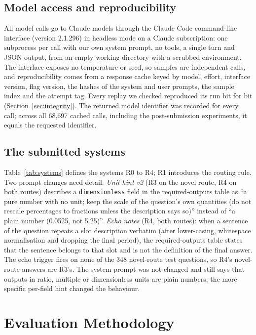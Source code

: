 \documentclass[conference]{IEEEtran}
\newcommand{\id}[1]{\texttt{#1}}
\begin{document}
\subsection{Model access and reproducibility}\label{sec:model}
All model calls go to Claude models through the Claude Code command-line interface (version 2.1.296) in headless mode on a Claude subscription: one subprocess per call with our own system prompt, no tools, a single turn and JSON output, from an empty working directory with a scrubbed environment. The interface exposes no temperature or seed, so samples are independent calls, and reproducibility comes from a response cache keyed by model, effort, interface version, flag version, the hashes of the system and user prompts, the sample index and the attempt tag. Every replay we checked reproduced its run bit for bit (Section~\ref{sec:integrity}). The returned model identifier was recorded for every call; across all 68,697 cached calls, including the post-submission experiments, it equals the requested identifier.

\subsection{The submitted systems}\label{sec:systems}
Table~\ref{tab:systems} defines the systems R0 to R4; R1 introduces the routing rule. Two prompt changes need detail. \emph{Unit hint v2} (R3 on the novel route, R4 on both routes) describes a \id{dimensionless} field in the required-outputs table as ``a pure number with no unit; keep the scale of the question's own quantities (do not rescale percentages to fractions unless the description says so)'' instead of ``a plain number (0.0525, not 5.25)''. \emph{Echo notes} (R4, both routes): when a sentence of the question repeats a slot description verbatim (after lower-casing, whitespace normalisation and dropping the final period), the required-outputs table states that the sentence belongs to that slot and is not the definition of the final answer. The echo trigger fires on none of the 348 novel-route test questions, so R4's novel-route answers are R3's. The system prompt was not changed and still says that outputs in ratio, multiple or dimensionless units are plain numbers; the more specific per-field hint changed the behaviour.

\section{Evaluation Methodology}\label{sec:method}
\end{document}
